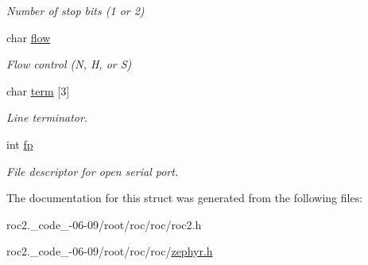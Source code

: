 \begin{DoxyCompactItemize}
\begin{DoxyCompactList}\small\item\em Number of stop bits (1 or 2) \end{DoxyCompactList}\item 
\mbox{\label{structserial_a543b38efa076f4c10ccaf7b597fd70c1}} 
char \hyperlink{structserial_a543b38efa076f4c10ccaf7b597fd70c1}{flow}
\begin{DoxyCompactList}\small\item\em Flow control (\textquotesingle{}N\textquotesingle{}, \textquotesingle{}H\textquotesingle{}, or \textquotesingle{}S\textquotesingle{}) \end{DoxyCompactList}\item 
\mbox{\label{structserial_a0e0900b2aa9cf4d877b4b46b8fed744e}} 
char \hyperlink{structserial_a0e0900b2aa9cf4d877b4b46b8fed744e}{term} \mbox{[}3\mbox{]}
\begin{DoxyCompactList}\small\item\em Line terminator. \end{DoxyCompactList}\item 
\mbox{\label{structserial_a5794fd6ed295d17d7c80293f11f41b6b}} 
int \hyperlink{structserial_a5794fd6ed295d17d7c80293f11f41b6b}{fp}
\begin{DoxyCompactList}\small\item\em File descriptor for open serial port. \end{DoxyCompactList}\end{DoxyCompactItemize}


The documentation for this struct was generated from the following files\+:\begin{DoxyCompactItemize}
\item 
roc2.\+\_\+code\+\_-\/06-\/09/root/roc/roc/roc2.\+h\item 
roc2.\+\_\+code\+\_-\/06-\/09/root/roc/roc/\hyperlink{zephyr_8h}{zephyr.\+h}\end{DoxyCompactItemize}
